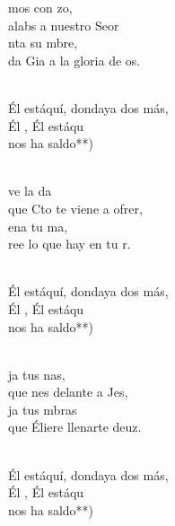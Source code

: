 \documentclass[12pt]{article}
\begin{document}
\begin{multicols*}{2}
\begin{cancion}%
	mos con zo,\\
	alabs a nuestro Seor\\
	nta su mbre, \\
	da Gia a la gloria de os.\\\jump\\
	\begin{chorus}%
	Él estáquí, dondaya dos más,\\
	Él , Él estáqu    \\
	nos ha saldo**)\\
	\end{chorus}%
	\jump\\
	ve la da \\
	que Cto te viene a ofrer,\\
	ena tu ma, \\
	ree lo que hay en tu r.\\\jump\\
	\begin{chorus}%
	Él estáquí, dondaya dos más,\\
	Él , Él estáqu    \\
	nos ha saldo**)\\
	\end{chorus}%
	\jump\\
	ja tus nas, \\
	que nes delante a Jes, \\
	ja tus mbras \\
	que Éliere llenarte deuz.\\\jump\\
	\begin{chorus}%
	Él estáquí, dondaya dos más,\\
	Él , Él estáqu    \\
	nos ha saldo**)\\
	\end{chorus}%
	\jump\\
\end{cancion}%


\end{multicols*}
\end{document}
